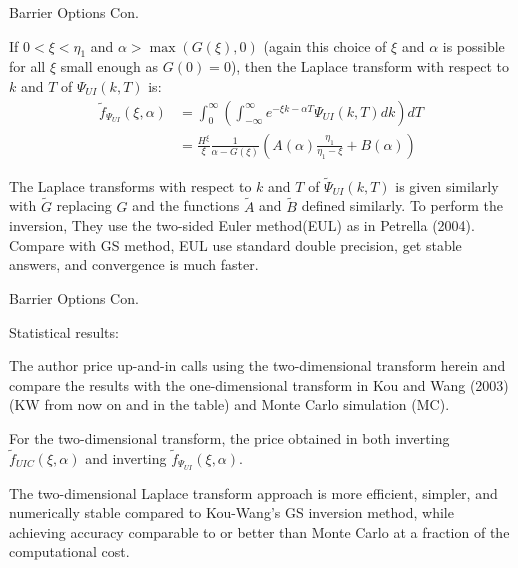 \documentclass{beamer}
\begin{document}
\begin{frame}{Barrier Options Con.}

    {\footnotesize \footnotesize
    \par  If \(0 < \xi < \eta_1\) and \(\alpha > \max(G(\xi), 0)\) (again this choice of \(\xi\) and \(\alpha\) is possible for 
    all \(\xi\) small enough as \(G(0) = 0\)), then the Laplace transform with respect to \(k\) and \(T\) of \(\Psi_{UI}(k, T)\) is:
     \vspace{1em}
    \begin{align*}
        \tilde{f}_{\Psi_{UI}}(\xi, \alpha) &= \int_0^{\infty} \left( \int_{-\infty}^{\infty} e^{-\xi k - \alpha T} \Psi_{UI}(k, T) dk \right) dT\\
    &= \frac{H^{\xi}}{\xi} \frac{1}{\alpha - G(\xi)} \left( A(\alpha) \frac{\eta_1}{\eta_1 - \xi} + B(\alpha) \right)
    \end{align*}

    \vspace{1em}
    \par The Laplace transforms with respect to \(k\) and \(T\) of \(\tilde{\Psi}_{UI}(k, T)\) is given 
    similarly with \(\tilde{G}\) replacing \(G\) and the functions \(\tilde{A}\) and \(\tilde{B}\) defined similarly. 
    To perform the inversion, They use the two-sided Euler method(EUL) as in Petrella (2004). Compare with GS method, EUL use standard double
     precision, get stable answers, and convergence is much faster.

    }
\end{frame}


\begin{frame}{Barrier Options Con.}

    {\footnotesize \footnotesize
    \par Statistical results:
    \vspace{1em}
    \par The author price up-and-in calls using the two-dimensional transform
     herein and compare the results with the one-dimensional transform in Kou and Wang (2003) (KW from now on and in the table) 
     and Monte Carlo simulation (MC). 
      \vspace{1em}
    \par For the two-dimensional transform, the price obtained in both inverting $ \tilde{f}_{UIC}(\xi, \alpha)$ and inverting $ \tilde{f}_{\Psi_{UI}}(\xi, \alpha)$.
     \vspace{1em}
    \par The two-dimensional Laplace transform approach is more efficient, simpler, and numerically 
    stable compared to Kou-Wang's GS inversion method, while achieving accuracy comparable to or better than Monte Carlo at a fraction of the computational cost.
    }   
\end{frame}



    
\end{document}
